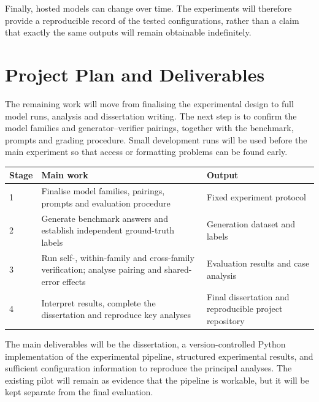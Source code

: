 \documentclass[11pt,a4paper]{article}
\begin{document}
	Finally, hosted models can change over time. The experiments will therefore provide a reproducible record of the tested configurations, rather than a claim that exactly the same outputs will remain obtainable indefinitely.
	
	\section{Project Plan and Deliverables}
	
	The remaining work will move from finalising the experimental design to full model runs, analysis and dissertation writing. The next step is to confirm the model families and generator--verifier pairings, together with the benchmark, prompts and grading procedure. Small development runs will be used before the main experiment so that access or formatting problems can be found early.
	
	\begin{center}
		\begin{tabular}{p{} p{} p{}}
			\toprule
			\textbf{Stage} & \textbf{Main work} & \textbf{Output} \\
			\midrule
			1 & Finalise model families, pairings, prompts and evaluation procedure & Fixed experiment protocol \\
			2 & Generate benchmark answers and establish independent ground-truth labels & Generation dataset and labels \\
			3 & Run self-, within-family and cross-family verification; analyse pairing and shared-error effects & Evaluation results and case analysis \\
			4 & Interpret results, complete the dissertation and reproduce key analyses & Final dissertation and reproducible project repository \\
			\bottomrule
		\end{tabular}
	\end{center}
	
	The main deliverables will be the dissertation, a version-controlled Python implementation of the experimental pipeline, structured experimental results, and sufficient configuration information to reproduce the principal analyses. The existing pilot will remain as evidence that the pipeline is workable, but it will be kept separate from the final evaluation.
	
	
	
	
	
\end{document}
